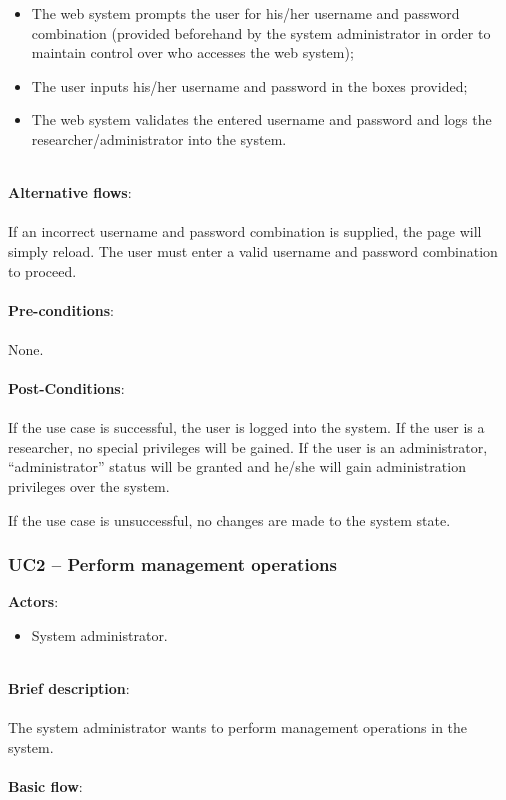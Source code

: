 \begin{itemize}
\item The web system prompts the user for his/her username and password combination (provided beforehand by the system administrator in order to maintain control over who accesses the web system);
\item The user inputs his/her username and password in the boxes provided;
\item The web system validates the entered username and password and logs the researcher/administrator into the system.
\end{itemize}

\ \\
\textbf{Alternative flows}:\\
\ \\
If an incorrect username and password combination is supplied, the page will simply reload. The user must enter a valid username and password combination to proceed.\\
\ \\
\textbf{Pre-conditions}:\\
\ \\
None.\\
\ \\
\textbf{Post-Conditions}:\\
\ \\
If the use case is successful, the user is logged into the system. If the user is a researcher, no special privileges will be gained. If the user is an administrator, ``administrator'' status will be granted and he/she will gain administration privileges over the system.

If the use case is unsuccessful, no changes are made to the system state.

\subsubsection{UC2 -- Perform management operations}\label{uc2}

\textbf{Actors}:

\begin{itemize}
\item System administrator.
\end{itemize}

\ \\
\textbf{Brief description}:\\
\ \\
The system administrator wants to perform management operations in the system.\\
\ \\
\textbf{Basic flow}:

